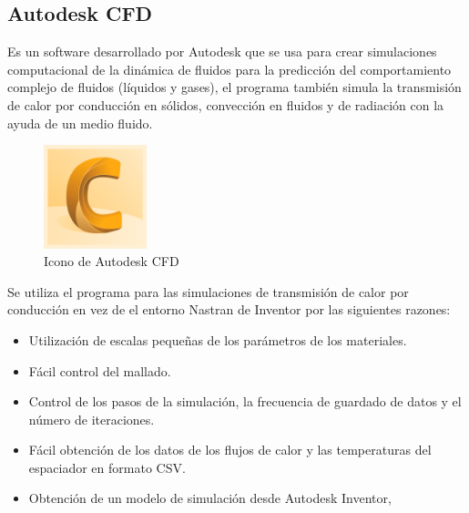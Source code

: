 \subsection{Autodesk CFD}
Es un software desarrollado por Autodesk que se usa para crear simulaciones computacional de la dinámica de fluidos para la predicción del comportamiento complejo de fluidos (líquidos y gases), el programa también simula la transmisión de calor por conducción en sólidos, convección en fluidos y de radiación con la ayuda de un medio fluido. \\
\begin{figure}[H]
	\centering
		\includegraphics[width=3cm]{figuras/CFD.png}
	\caption{Icono de Autodesk CFD}
	\label{fig:CFD}
\end{figure}
Se utiliza el programa para las simulaciones de transmisión de calor por conducción en vez de el entorno Nastran de Inventor por las siguientes razones:
\begin{itemize}
	\item Utilización de escalas pequeñas de los parámetros de los materiales.
	\item Fácil control del mallado.
	\item Control de los pasos de la simulación, la frecuencia de guardado de datos y el número de iteraciones.
	\item Fácil obtención de los datos de los flujos de calor y las temperaturas del espaciador en formato CSV.
	\item Obtención de un modelo de simulación desde Autodesk Inventor,
\end{itemize}

